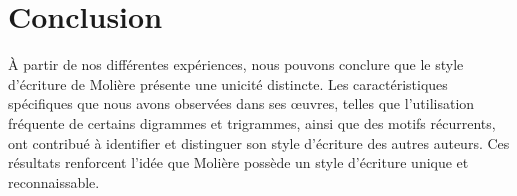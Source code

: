 \documentclass[]{report}
\begin{document}
\section{Conclusion}
\vspace{\baselineskip}
\hspace{0,5cm} À partir de nos différentes expériences, nous pouvons conclure
que le style d'écriture de Molière présente une unicité distincte. Les
caractéristiques spécifiques que nous avons observées dans ses œuvres, telles
que l'utilisation fréquente de certains digrammes et trigrammes, ainsi que des
motifs récurrents, ont contribué à identifier et distinguer son style d'écriture
des autres auteurs. Ces résultats renforcent l'idée que Molière possède un style
d'écriture unique et reconnaissable.
\end{document}
